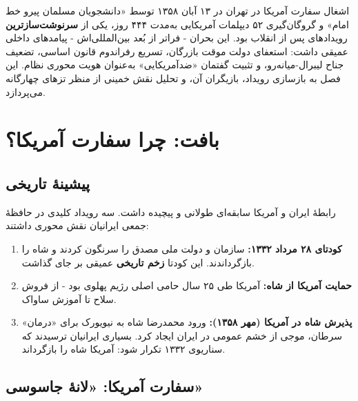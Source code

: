 \documentclass[12pt,a4paper]{book}
\newcommand{\keyword}[1]{\textbf{\textcolor{cPrimary}{#1}}}
\newcommand{\en}[1]{\lr{\textit{#1}}}
\begin{document}
\begin{infoBox}
اشغال سفارت آمریکا در تهران در ۱۳ آبان ۱۳۵۸ توسط «دانشجویان مسلمان پیرو خط امام» و گروگان‌گیری ۵۲ دیپلمات آمریکایی به‌مدت ۴۴۴ روز، یکی از \keyword{سرنوشت‌سازترین} رویدادهای پس از انقلاب بود. این بحران - فراتر از بُعد بین‌المللی‌اش - پیامدهای داخلی عمیقی داشت: استعفای دولت موقت بازرگان، تسریع رفراندوم قانون اساسی، تضعیف جناح لیبرال-میانه‌رو، و تثبیت گفتمان «ضدآمریکایی» به‌عنوان هویت محوری نظام. این فصل به بازسازی رویداد، بازیگران آن، و تحلیل نقش خمینی از منظر تزهای چهارگانه می‌پردازد.
\end{infoBox}

\section{بافت: چرا سفارت آمریکا؟}

\subsection{پیشینهٔ تاریخی}

رابطهٔ ایران و آمریکا سابقه‌ای طولانی و پیچیده داشت. سه رویداد کلیدی در حافظهٔ جمعی ایرانیان نقش محوری داشتند:

\begin{enumerate}[label=\textcolor{cPrimary}{\bfseries\arabic*.}, rightmargin=2em]
    \item \textbf{کودتای ۲۸ مرداد ۱۳۳۲:} سازمان \en{CIA} و \en{MI6} دولت ملی مصدق را سرنگون کردند و شاه را بازگرداندند. این کودتا \keyword{زخم تاریخی} عمیقی بر جای گذاشت.
    
    \item \textbf{حمایت آمریکا از شاه:} آمریکا طی ۲۵ سال حامی اصلی رژیم پهلوی بود - از فروش سلاح تا آموزش ساواک.
    
    \item \textbf{پذیرش شاه در آمریکا (مهر ۱۳۵۸):} ورود محمدرضا شاه به نیویورک برای «درمان» سرطان، موجی از خشم عمومی در ایران ایجاد کرد. بسیاری ایرانیان ترسیدند که سناریوی ۱۳۳۲ تکرار شود: آمریکا شاه را بازگرداند.
\end{enumerate}

\subsection{سفارت آمریکا: «لانهٔ جاسوسی»}
\end{document}
